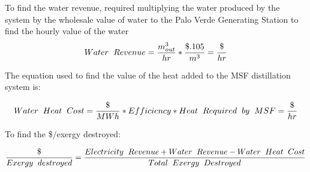 To find the water revenue, required multiplying the water produced by the system by the wholesale value of water to the Palo Verde Generating Station to find the hourly value of the water
\begin{equation}
Water\hspace{.2cm} Revenue=\frac{m^3_{out}}{hr}*\frac{\$.105}{m^3}=\frac{\$}{hr}
\label{water}
\end{equation}

The equation used to find the value of the heat added to the MSF distillation system is:

\begin{equation}
Water\hspace{.2cm} Heat \hspace{.2cm} Cost=\frac{\$}{MWh}*Efficiency*Heat \hspace{.2cm}Required  \hspace{.2cm} by  \hspace{.2cm} MSF=\frac{\$}{hr}
\end{equation}

To find the \$/exergy destroyed:

\begin{equation}
\frac{\$}{Exergy\hspace{.2cm}destroyed}=\frac{Electricity \hspace{.2cm} Revenue+ Water \hspace{.2cm} Revenue - Water \hspace{.2cm} Heat\hspace{.2cm}Cost}{Total\hspace{.2cm}Exergy\hspace{.2cm}Destroyed}
\end{equation}

